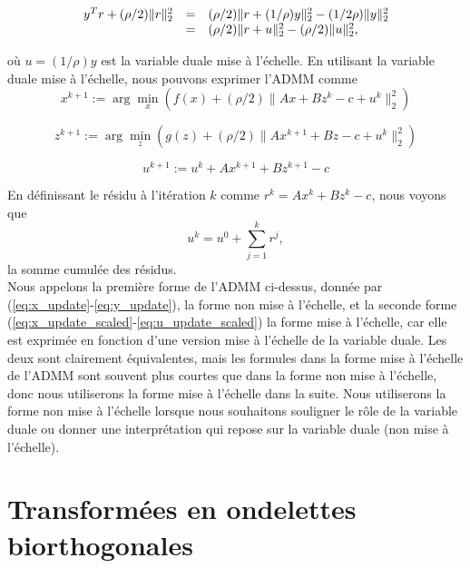 \begin{equation}
    \begin{array}{l l l}
        y^T r + (\rho/2) \|r\|_2^2 &=& (\rho/2) \|r + (1/\rho)y\|_2^2 - (1/2\rho) \|y\|_2^2\\
        &=& (\rho/2) \|r + u\|_2^2 - (\rho/2) \|u\|_2^2,
    \end{array}
\end{equation}

où \( u = (1/\rho)y \) est la variable duale mise à l'échelle. En utilisant la variable duale mise à l'échelle, nous pouvons exprimer l'ADMM comme
\begin{equation}
    x^{k+1} := \arg\min_x \left( f(x) + (\rho/2) \|Ax + Bz^k - c + u^k\|_2^2 \right)
    \label{eq:x_update_scaled}
\end{equation}

\begin{equation}
    z^{k+1} := \arg\min_z \left( g(z) + (\rho/2) \|Ax^{k+1} + Bz - c + u^k\|_2^2 \right)
    \label{eq:z_update_scaled}
\end{equation}

\begin{equation}
    u^{k+1} := u^k + Ax^{k+1} + Bz^{k+1} - c
    \label{eq:u_update_scaled}
\end{equation}

En définissant le résidu à l'itération \( k \) comme \( r^k = Ax^k + Bz^k - c \), nous voyons que
\begin{equation}u^k = u^0 + \sum_{j=1}^k r^j,\end{equation}
la somme cumulée des résidus.\\
Nous appelons la première forme de l'ADMM ci-dessus, donnée par (\eqref{eq:x_update}-\eqref{eq:y_update}), la forme non mise à l'échelle, et la seconde forme (\eqref{eq:x_update_scaled}-\eqref{eq:u_update_scaled}) la forme mise à l'échelle, car elle est exprimée en fonction d'une version mise à l'échelle de la variable duale. Les deux sont clairement équivalentes, mais les formules dans la forme mise à l'échelle de l'ADMM sont souvent plus courtes que dans la forme non mise à l'échelle, donc nous utiliserons la forme mise à l'échelle dans la suite. Nous utiliserons la forme non mise à l'échelle lorsque nous souhaitons souligner le rôle de la variable duale ou donner une interprétation qui repose sur la variable duale (non mise à l'échelle).

\section{Transformées en ondelettes biorthogonales}

